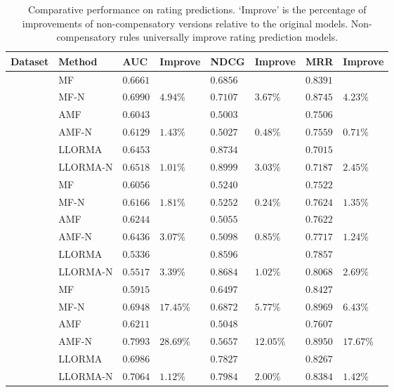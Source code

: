 \documentclass[letterpaper]{article} %
\begin{document}
\begin{table}[htp]
\tiny
\caption{Comparative performance on rating predictions. `Improve' is the percentage of improvements of non-compensatory versions relative to the original models. Non-compensatory rules universally improve rating prediction models.}
\begin{center}
\begin{tabular}{p{0.4cm}<{\centering}|p{1.2cm}<{\centering} |p{0.5cm} p{0.6cm} |p{0.5cm} p{0.6cm} |p{0.5cm} p{0.6cm}}
\hline
Dataset	& Method	& AUC	& Improve&	NDCG&	Improve&	MRR	&Improve\\\hline
{} &	MF	& $0.6661$ 	& &	$0.6856$ 	&&	$0.8391$ 	&\\
	&MF-N	&$0.6990$ &	$4.94\%$	&$0.7107 $	&$3.67\%$	&$0.8745$ &	$4.23\%$	\\
	&AMF&	$0.6043$ 	&&	$0.5003$ 	&&	$0.7506$ &\\
	&AMF-N	&$0.6129$ 	&$1.43\%$	&$0.5027$ &	$0.48\%$	&$0.7559$ 	&$0.71\%$	\\
	&LLORMA		&$0.6453$&	&$0.8734$ 	&&	$0.7015$&\\	
	&LLORMA-N	&$0.6518$	&$1.01\%$	&	$0.8999$ 	&$3.03\%$	&$0.7187$ 	&$2.45\%$	\\
	\hline
{}	&MF	&$0.6056 $	&&	$0.5240$&&		$0.7522 $	&	\\
	&MF-N&	$0.6166$ 	&$1.81\%$	&$0.5252$ 	&$0.24\%$	&$0.7624$ 	&$1.35\%$\\
	&AMF	&$0.6244 $	&&	$0.5055 $&&		$0.7622 $	&	\\
	&AMF-N	&$0.6436$ 	&$3.07\%$	&$0.5098$ 	&$0.85\%$	&$0.7717$ 	&$1.24\%$	\\
	&LLORMA	&$0.5336$& &		$0.8596$ 	&&	$0.7857$ 	&	\\
	&LLORMA-N		&$0.5517$	&$3.39\%$ &	$0.8684$ &	$1.02\%$	&$0.8068$ 	&$2.69\%$	\\
	\hline
{}	&MF	&$0.5915$ 	&&	$0.6497$&	&	$0.8427$ &	\\
	&MF-N	&$0.6948$ 	&$17.45\%$	&$0.6872$ 	&$5.77\%$	&$0.8969 $	&$6.43\%$	\\
	&AMF	&$0.6211$ 	&&	$0.5048$ 	&&	$0.7607$ 	&	\\
	&AMF-N	&$0.7993 $&	$28.69\%$	&$0.5657$ 	&$12.05\%$	&$0.8950$ 	&$17.67\%$	\\
	&LLORMA		&$0.6986$&	&$0.7827 $		&&$0.8267$ 		& 	\\
	&LLORMA-N	&$0.7064$	&$1.12\%$&	$0.7984$ 	&$2.00\%$	&$0.8384 $	&$1.42\%$	\\
	\hline
	\end{tabular}
\end{center}
\label{tab:ratingresult}
\end{table}
\end{document}
